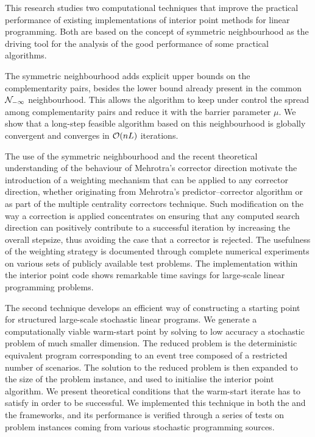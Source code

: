 
%
%

This research studies two computational techniques that improve
the practical performance of existing implementations 
of interior point methods for linear programming.
Both are based on the concept of symmetric neighbourhood 
as the driving tool for the analysis of the good 
performance of some practical algorithms. 

The symmetric neighbourhood adds explicit upper bounds
on the complementarity pairs, besides the lower bound already
present in the common $\mathcal{N}_{-\infty}$ neighbourhood.
This allows the algorithm to keep under control the spread among 
complementarity pairs and reduce it with the barrier parameter $\mu$.
We show that a long-step feasible algorithm based on 
this neighbourhood is globally convergent and
converges in $\mathcal{O}(nL)$ iterations.

The use of the symmetric neighbourhood and the recent
theoretical understanding of the behaviour of Mehrotra's
corrector direction motivate the introduction of a weighting
mechanism that can be applied to any corrector direction,
whether originating from Mehrotra's predictor--corrector algorithm
or as part of the multiple centrality correctors technique.
Such modification on the way a correction is applied
concentrates on ensuring that any computed search direction can positively
contribute to a successful iteration by increasing the overall
stepsize, thus avoiding the case that a corrector is rejected.
The usefulness of the weighting strategy is documented through
complete numerical experiments on various sets of publicly
available test problems.
The implementation within the \HOPDM interior point code
shows remarkable time savings for large-scale linear programming problems.

The second technique develops an efficient way of 
constructing a starting point for structured large-scale 
stochastic linear programs.
We generate a computationally viable warm-start point by solving 
to low accuracy a stochastic problem of much smaller dimension.
The reduced problem is the deterministic equivalent program
corresponding to an event tree composed of a restricted number
of scenarios.
The solution to the reduced problem is then expanded to the
size of the problem instance, and used to initialise the
interior point algorithm.
We present theoretical conditions that the warm-start iterate
has to satisfy in order to be successful.
We implemented this technique in both the \HOPDM and the \OOPS
frameworks, and its performance is verified through 
a series of tests on problem instances coming from various stochastic
programming sources.
